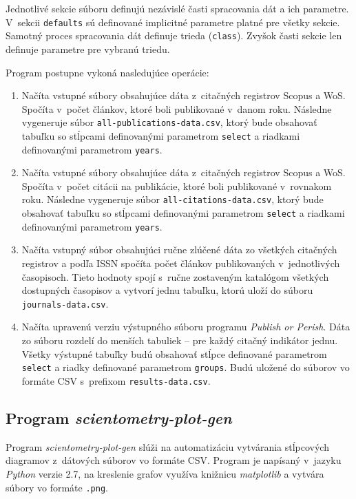 Jednotlivé sekcie súboru definujú nezávislé časti spracovania dát a ich
parametre.  V~sekcii \verb|defaults| sú definované implicitné parametre platné
pre všetky sekcie.  Samotný proces spracovania dát definuje trieda
(\verb|class|).  Zvyšok časti sekcie len definuje parametre pre vybranú triedu.

Program postupne vykoná nasledujúce operácie:

\begin{enumerate}
\item Načíta vstupné súbory obsahujúce dáta z~citačných registrov Scopus a WoS.
  Spočíta v~počet článkov, ktoré boli publikované v~danom roku.  Následne
  vygeneruje súbor \verb|all-publications-data.csv|, ktorý bude obsahovať
  tabuľku so stĺpcami definovanými parametrom \verb|select| a riadkami
  definovanými parametrom \verb|years|.
\item Načíta vstupné súbory obsahujúce dáta z~citačných registrov Scopus a WoS.
  Spočíta v~počet citácii na publikácie, ktoré boli publikované v~rovnakom roku.
  Následne vygeneruje súbor \verb|all-citations-data.csv|, ktorý bude obsahovať
  tabuľku so stĺpcami definovanými parametrom \verb|select| a riadkami
  definovanými parametrom \verb|years|.
\item Načíta vstupný súbor obsahujúci ručne zlúčené dáta zo všetkých citačných
  registrov a podľa ISSN spočíta počet článkov publikovaných v~jednotlivých
  časopisoch.  Tieto hodnoty spojí s~ručne zostaveným katalógom všetkých
  dostupných časopisov a vytvorí jednu tabuľku, ktorú uloží do súboru
  \verb|journals-data.csv|.
\item Načíta upravenú verziu výstupného súboru programu \emph{Publish or
    Perish}.  Dáta zo súboru rozdelí do menších tabuliek -- pre každý citačný
  indikátor jednu.  Všetky výstupné tabuľky budú obsahovať stĺpce definované
  parametrom \verb|select| a riadky definované parametrom \verb|groups|.  Budú
  uložené do súborov vo formáte CSV s~prefixom \verb|results-data.csv|.
\end{enumerate}


\subsection*{Program \emph{scientometry-plot-gen}}

Program \emph{scientometry-plot-gen} slúži na automatizáciu vytvárania
stĺpcových diagramov z~dátových súborov vo formáte CSV.  Program je napísaný
v~jazyku \emph{Python} verzie 2.7, na kreslenie grafov využíva knižnicu
\emph{matplotlib} a vytvára súbory vo formáte \texttt{.png}.

